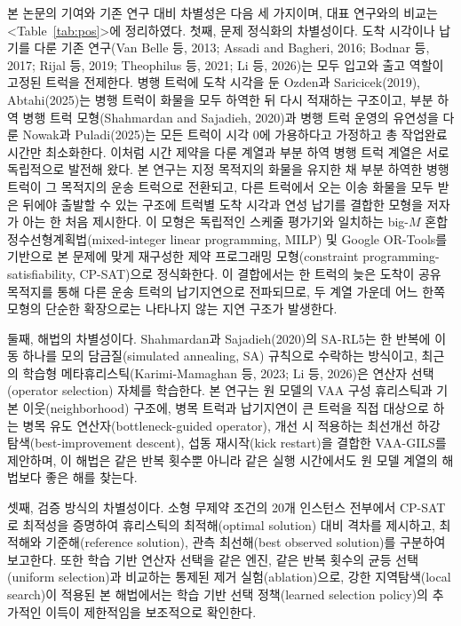 \documentclass[10pt,a4paper]{article}
\begin{document}
본 논문의 기여와 기존 연구 대비 차별성은 다음 세 가지이며, 대표 연구와의 비교는 <Table~\ref{tab:pos}>에
정리하였다. 첫째, 문제 정식화의 차별성이다. 도착 시각이나 납기를 다룬 기존 연구(Van Belle 등, 2013; Assadi and
Bagheri, 2016; Bodnar 등, 2017; Rijal 등, 2019; Theophilus 등, 2021; Li 등, 2026)는 모두 입고와 출고 역할이 고정된
트럭을 전제한다. 병행 트럭에 도착 시각을 둔 Ozden과 Saricicek(2019), Abtahi(2025)는 병행 트럭이 화물을 모두 하역한 뒤
다시 적재하는 구조이고, 부분 하역 병행 트럭 모형(Shahmardan and Sajadieh, 2020)과 병행 트럭 운영의 유연성을 다룬
Nowak과 Puladi(2025)는 모든 트럭이 시각 0에 가용하다고 가정하고 총 작업완료시간만 최소화한다. 이처럼 시간 제약을 다룬 계열과 부분 하역 병행 트럭 계열은 서로 독립적으로 발전해 왔다. 본 연구는 지정 목적지의 화물을 유지한 채 부분 하역한 병행 트럭이 그 목적지의
운송 트럭으로 전환되고, 다른 트럭에서 오는 이송 화물을 모두 받은 뒤에야 출발할 수 있는 구조에 트럭별 도착 시각과
연성 납기를 결합한 모형을 저자가 아는 한 처음 제시한다. 이 모형은 독립적인 스케줄 평가기와 일치하는
big-$M$ 혼합정수선형계획법(mixed-integer linear programming, MILP) 및 Google OR-Tools를 기반으로 본 문제에 맞게 재구성한 제약 프로그래밍 모형(constraint programming-satisfiability, CP-SAT)으로 정식화한다. 이 결합에서는 한 트럭의 늦은 도착이 공유 목적지를 통해 다른 운송
트럭의 납기지연으로 전파되므로, 두 계열 가운데 어느 한쪽 모형의 단순한 확장으로는 나타나지 않는 지연 구조가 발생한다.

둘째, 해법의 차별성이다. Shahmardan과 Sajadieh(2020)의 SA-RL5는 한 반복에 이동 하나를 모의 담금질(simulated annealing, SA) 규칙으로 수락하는 방식이고, 최근의 학습형 메타휴리스틱(Karimi-Mamaghan 등, 2023; Li 등, 2026)은 연산자 선택(operator selection) 자체를
학습한다. 본 연구는 원 모델의 VAA 구성 휴리스틱과 기본 이웃(neighborhood) 구조에, 병목 트럭과 납기지연이 큰 트럭을 직접 대상으로 하는
병목 유도 연산자(bottleneck-guided operator), 개선 시 적용하는 최선개선 하강 탐색(best-improvement descent),
섭동 재시작(kick restart)을 결합한 VAA-GILS를 제안하며, 이 해법은 같은 반복 횟수뿐 아니라 같은 실행 시간에서도 원 모델
계열의 해법보다 좋은 해를 찾는다.

셋째, 검증 방식의 차별성이다. 소형 무제약 조건의 20개 인스턴스 전부에서 CP-SAT로
최적성을 증명하여 휴리스틱의 최적해(optimal solution) 대비 격차를 제시하고, 최적해와 기준해(reference solution), 관측 최선해(best observed solution)를 구분하여 보고한다. 또한 학습 기반
연산자 선택을 같은 엔진, 같은 반복 횟수의 균등 선택(uniform selection)과 비교하는 통제된 제거 실험(ablation)으로, 강한 지역탐색(local search)이 적용된 본 해법에서는 학습 기반 선택 정책(learned selection policy)의
추가적인 이득이 제한적임을 보조적으로 확인한다.
\end{document}
